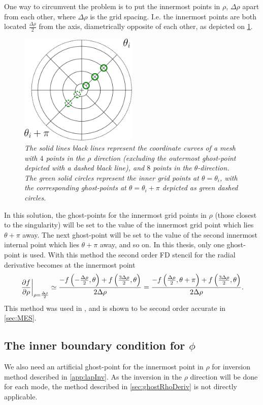 One way to circumvent the problem is to put the innermost points in $\rho$, $\Delta \rho$ apart from each other, where $\Delta \rho$ is the grid spacing.
I.e. the innermost points are both located $\frac{\Delta \rho}{2}$ from the axis, diametrically opposite of each other, as depicted on \cref{fig:innerRho}.
%
\begin{figure}[htb]
    \centering
    \includegraphics[width=0.5\textwidth]{fig/innerGhost}
    \caption{\textit{
The solid lines black lines represent the coordinate curves of a mesh with $4$ points in the $\rho$ direction (excluding the outermost ghost-point depicted with a dashed black line), and $8$ points in the $\theta$-direction.
The green solid circles represent the inner grid points at $\theta=\theta_i$, with the corresponding ghost-points at $\theta=\theta_i + \pi$ depicted as green dashed circles.
    }}
    \label{fig:innerRho}
\end{figure}
%
In this solution, the ghost-points for the innermost grid points in $\rho$ (those closest to the singularity) will be set to the value of the innermost grid point which lies $\theta + \pi$ away.
The next ghost-point will be set to the value of the second innermost internal point which lies $\theta + \pi$ away, and so on.
In this thesis, only one ghost-point is used.
With this method the second order FD stencil for the radial derivative becomes at the innermost point
%
\begin{align*}
    \left.\frac{\partial {f}}{\partial{\rho}}\right|_{\rho=\frac{\Delta \rho}{2}} \simeq
    \frac{-f\left(-\frac{\Delta \rho}{2}, \theta\right) + f\left(\frac{3\Delta \rho}{2}, \theta\right)}{2\Delta \rho}
    =
    \frac{-f\left(\frac{\Delta \rho}{2}, \theta+\pi\right) + f\left(\frac{3\Delta \rho}{2}, \theta\right)}{2\Delta \rho}.
\end{align*}
%
This method was used in \cite{Naulin2008}, and is shown to be second order accurate in \cref{sec:MES}.

\subsection{The inner boundary condition for \texorpdfstring{$\phi$}{the potential}}
\label{sec:innerPhiBC}
%
We also need an artificial ghost-point for the innermost point in $\rho$ for inversion method described in \cref{app:lapInv}.
As the inversion in the $\rho$ direction will be done for each mode, the method described in \cref{sec:ghostRhoDeriv} is not directly applicable.

